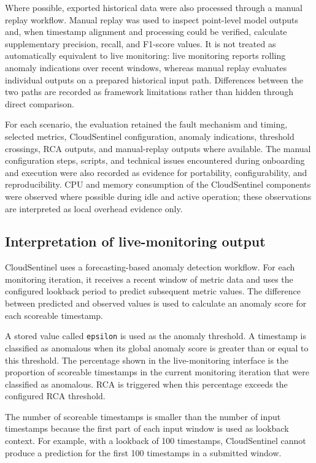 Where possible, exported historical data were also processed through a manual replay workflow. Manual replay was used to inspect point-level model outputs and, when timestamp alignment and processing could be verified, calculate supplementary precision, recall, and F1-score values. It is not treated as automatically equivalent to live monitoring: live monitoring reports rolling anomaly indications over recent windows, whereas manual replay evaluates individual outputs on a prepared historical input path. Differences between the two paths are recorded as framework limitations rather than hidden through direct comparison.

For each scenario, the evaluation retained the fault mechanism and timing, selected metrics, CloudSentinel configuration, anomaly indications, threshold crossings, RCA outputs, and manual-replay outputs where available. The manual configuration steps, scripts, and technical issues encountered during onboarding and execution were also recorded as evidence for portability, configurability, and reproducibility. CPU and memory consumption of the CloudSentinel components were observed where possible during idle and active operation; these observations are interpreted as local overhead evidence only.

\subsection{Interpretation of live-monitoring output}
CloudSentinel uses a forecasting-based anomaly detection workflow. For each monitoring iteration, it receives a recent window of metric data and uses the configured lookback period to predict subsequent metric values. The difference between predicted and observed values is used to calculate an anomaly score for each scoreable timestamp.

A stored value called \texttt{epsilon} is used as the anomaly threshold. A timestamp is classified as anomalous when its global anomaly score is greater than or equal to this threshold. The percentage shown in the live-monitoring interface is the proportion of scoreable timestamps in the current monitoring iteration that were classified as anomalous. RCA is triggered when this percentage exceeds the configured RCA threshold.

The number of scoreable timestamps is smaller than the number of input timestamps because the first part of each input window is used as lookback context. For example, with a lookback of 100 timestamps, CloudSentinel cannot produce a prediction for the first 100 timestamps in a submitted window.

